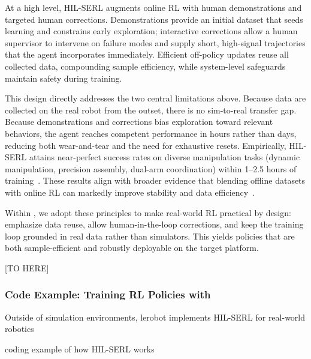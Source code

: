 At a high level, HIL-SERL augments online RL with human demonstrations and targeted human corrections. Demonstrations provide an initial dataset that seeds learning and constrains early exploration; interactive corrections allow a human supervisor to intervene on failure modes and supply short, high-signal trajectories that the agent incorporates immediately. Efficient off-policy updates reuse all collected data, compounding sample efficiency, while system-level safeguards maintain safety during training.

This design directly addresses the two central limitations above. Because data are collected on the real robot from the outset, there is no sim-to-real transfer gap. Because demonstrations and corrections bias exploration toward relevant behaviors, the agent reaches competent performance in hours rather than days, reducing both wear-and-tear and the need for exhaustive resets. Empirically, HIL-SERL attains near-perfect success rates on diverse manipulation tasks (dynamic manipulation, precision assembly, dual-arm coordination) within 1--2.5 hours of training~\citep{luoPreciseDexterousRobotic2024}. These results align with broader evidence that blending offline datasets with online RL can markedly improve stability and data efficiency~\citep{ballEfficientOnlineReinforcement2023}.

Within \lerobot, we adopt these principles to make real-world RL practical by design: emphasize data reuse, allow human-in-the-loop corrections, and keep the training loop grounded in real data rather than simulators. This yields policies that are both sample-efficient and robustly deployable on the target platform.

[TO HERE]
\subsubsection*{Code Example: Training RL Policies with \lerobot}
Outside of simulation environments, lerobot implements HIL-SERL for real-world robotics

coding example of how HIL-SERL works

